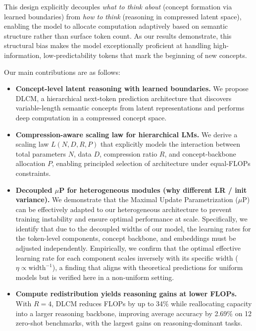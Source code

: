 This design explicitly decouples \emph{what to think about} (concept formation via learned boundaries) from \emph{how to think} (reasoning in compressed latent space), enabling the model to allocate computation adaptively based on semantic structure rather than surface token count. As our results demonstrate, this structural bias makes the model exceptionally proficient at handling high-information, low-predictability tokens that mark the beginning of new concepts.

Our main contributions are as follows:
\begin{itemize}
    \item \textbf{Concept-level latent reasoning with learned boundaries.}
    We propose DLCM, a hierarchical next-token prediction architecture that discovers variable-length semantic concepts from latent representations and performs deep computation in a compressed concept space.

    \item \textbf{Compression-aware scaling law for hierarchical LMs.}
    We derive a scaling law $L(N,D,R,P)$ that explicitly models the interaction between total parameters $N$, data $D$, compression ratio $R$, and concept-backbone allocation $P$, enabling principled selection of architecture under equal-FLOPs constraints. \cite{hoffmann2022chinchilla}
    
    \item \textbf{Decoupled $\mu$P for heterogeneous modules (why different LR / init variance).}
    We demonstrate that the Maximal Update Parametrization ($\mu$P) can be effectively adapted to our heterogeneous architecture to prevent training instability and ensure optimal performance at scale. Specifically, we identify that due to the decoupled widths of our model, the learning rates for the token-level components, concept backbone, and embeddings must be adjusted independently. Empirically, we confirm that the optimal effective learning rate for each component scales inversely with its specific width ($\eta \propto \text{width}^{-1}$), a finding that aligns with theoretical predictions for uniform models but is verified here in a non-uniform setting.

    \item \textbf{Compute redistribution yields reasoning gains at lower FLOPs.}
    With $R=4$, DLCM reduces FLOPs by up to 34\% while reallocating capacity into a larger reasoning backbone, improving average accuracy by 2.69\% on 12 zero-shot benchmarks, with the largest gains on reasoning-dominant tasks.
\end{itemize}
